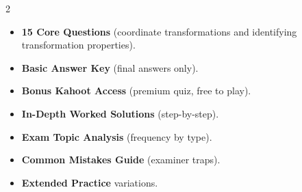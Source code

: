 \documentclass[11pt,a4paper]{article}
\newcommand{\FullReleaseDate}{April 30, 2026}
\begin{document}
\vspace{8pt}

\begin{multicols}{2}
  \begin{tcolorbox}[card, title=\sffamily\bfseries\textcolor{white}{\faHandPointDown\ TODAY (Simplified Version)}, colbacktitle=mainblue, boxed title style={sharp corners, boxrule=0pt}]
    \begin{itemize}[leftmargin=1.2em, itemsep=2pt]
      \item \small \textbf{15 Core Questions} (coordinate transformations and identifying transformation properties).
      \item \small \textbf{Basic Answer Key} (final answers only).
      \item \small \textbf{Bonus Kahoot Access} (premium quiz, free to play).
    \end{itemize}
  \end{tcolorbox}

  \columnbreak

  \begin{tcolorbox}[card, title=\sffamily\bfseries\textcolor{white}{\faRocket\ ON \FullReleaseDate\ (Full Upgrade)}, colbacktitle=mainblue, boxed title style={sharp corners, boxrule=0pt}]
    \begin{itemize}[leftmargin=1.2em, itemsep=2pt]
      \item \small \textbf{In-Depth Worked Solutions} (step-by-step).
      \item \small \textbf{Exam Topic Analysis} (frequency by type).
      \item \small \textbf{Common Mistakes Guide} (examiner traps).
      \item \small \textbf{Extended Practice} variations.
    \end{itemize}
  \end{tcolorbox}
\end{multicols}
\end{document}
